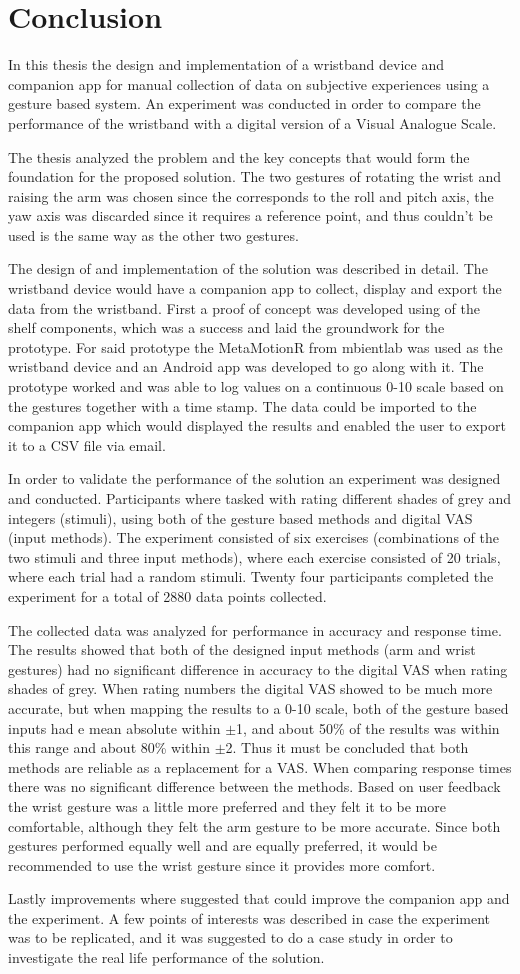 \chapter{Conclusion}\label{con_ch}
In this thesis the design and implementation of a wristband device and companion app for manual collection of data on subjective experiences using a gesture based system. An experiment was conducted in order to compare the performance of the wristband with a digital version of a Visual Analogue Scale.

The thesis analyzed the problem and the key concepts that would form the foundation for the proposed solution. The two gestures of rotating the wrist and raising the arm was chosen since the corresponds to the roll and pitch axis, the yaw axis was discarded since it requires a reference point, and thus couldn't be used is the same way as the other two gestures.

The design of and implementation of the solution was described in detail. The wristband device would have a companion app to collect, display and export the data from the wristband. First a proof of concept was developed using of the shelf components, which was a success and laid the groundwork for the prototype. For said prototype the MetaMotionR from mbientlab was used as the wristband device and an Android app was developed to go along with it. The prototype worked and was able to log values on a continuous 0-10 scale based on the gestures together with a time stamp. The data could be imported to the companion app which would displayed the results and enabled the user to export it to a CSV file via email. 

In order to validate the performance of the solution an experiment was designed and conducted. Participants where tasked with rating different shades of grey and integers (stimuli), using both of the gesture based methods and digital VAS (input methods). The experiment consisted of six exercises (combinations of the two stimuli and three input methods), where each exercise consisted of 20 trials, where each trial had a random stimuli. Twenty four participants completed the experiment for a total of 2880 data points collected.

The collected data was analyzed for performance in accuracy and response time. The results showed that both of the designed input methods (arm and wrist gestures) had no significant difference in accuracy to the digital VAS when rating shades of grey. When rating numbers the digital VAS showed to be much more accurate, but when mapping the results to a 0-10 scale, both of the gesture based inputs had e mean absolute within $\pm$1, and about 50\% of the results was within this range and about 80\% within $\pm$2. Thus it must be concluded that both methods are reliable as a replacement for a VAS. When comparing response times there was no significant difference between the methods. Based on user feedback the wrist gesture was a little more preferred and they felt it to be more comfortable, although they felt the arm gesture to be more accurate. Since both gestures performed equally well and are equally preferred, it would be recommended to use the wrist gesture since it provides more comfort.

Lastly improvements where suggested that could improve the companion app and the experiment. A few points of interests was described in case the experiment was to be replicated, and it was suggested to do a case study in order to investigate the real life performance of the solution.